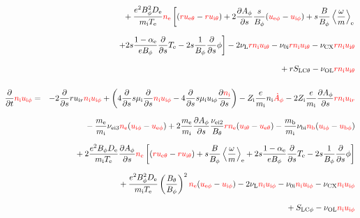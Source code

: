 \documentclass[11pt]{article}
\def\r#1{{\rm#1}}
\def\ddt{\frac{\partial}{\partial t}}
\def\dds{\frac{\partial}{\partial s}}
\def\dd#1{\frac{\partial #1}{\partial s}}
\def\ave#1{\left\langle#1\right\rangle}
\def\me{m_\r{e}}
\def\mi{m_\r{i}}
\def\mb{m_\r{b}}
\def\mui{\mu_\r{i}}
\def\De{D_\r{e}}
\def\Di{D_\r{i}}
\def\nee{n_\r{e}}
\def\ni{n_\r{i}}
\def\nb{n_\r{b}}
\def\uir{u_{\r{i}r}}
\def\ueth{u_{\r{e}\theta}}
\def\uith{u_{\r{i}\theta}}
\def\ueph{u_{\r{e}\phi}}
\def\uiph{u_{\r{i}\phi}}
\def\ubph{u_{\r{b}\phi}}
\def\Bth{B_\theta}
\def\Bph{B_\phi}
\def\Aphd{\dot{A}_\phi}
\def\Aph{A_\phi}
\def\Te{T_\r{e}}
\def\Ti{T_\r{i}}
\def\Zi{Z_\r{i}}
\def\nubi{\nu_\r{bi}}
\def\nuni{\nu_\r{0i}}
\def\nuL{\nu_\r{L}}
\def\nuCX{\nu_\r{CX}}
\def\nuOL{\nu_\r{OL}}
\def\red#1{\textcolor{red}{#1}}
\begin{document}
\begin{eqnarray}
\nonumber\\[2.5mm]&&{}
%
  + \frac{e^2 \Bph^2 \De}{\mi\Te}\red{\nee}
    \left[(\red{r \ueth} - \red{r \uith}) +
     2\dd{\Aph}\frac{s}{\Bph}(\red{\ueph} - \red{\uiph})
     + s \frac{B}{\Bph}\ave{\frac{\omega}{m}}_\r{e}\right.
\nonumber\\[2.5mm]&&{}
%
    \left.+ 2 s \frac{1-\alpha_\r{e}}{e\Bph} \dds \Te
     - 2 s \frac{1}{\Bph} \dds \phi \right]
%
%
  - 2 \nuL \red{r \ni \uith}
%
  - \nuni \red{r \ni \uith}
%
  - \nuCX \red{r \ni \uith}
\nonumber\\[2.5mm]&&{}
%
  + r S_\r{LC\theta}
%
  - \nuOL \red{r \ni \uith}
%
%
\\[5mm]
  \ddt \red{\ni \uiph} &=&
%
  - 2 \dds r \uir \red{\ni \uiph}
%
  + \left(   4 \dds s \mui \dds \red{\ni \uiph}
%
           - 4 \dds s \mui \uiph \dd{\red{\ni}} \right)
%
  - \Zi \frac{e}{\mi} \ni \red{\Aphd}
%
  - 2 \Zi \frac{e}{\mi} \dd{\Aph} \red{r \ni \uir} 
\nonumber\\[2.5mm]&&{}
%
  - \frac{\me}{\mi} \nu_\r{ei3} \red{\nee} (\red{\uiph} - \red{\ueph})
%
  + 2 \frac{\me}{\mi} \dd{\Aph} \frac{\nu_\r{ei2}}{\Bth} \red{r \nee} (\red{\uith} - \red{\ueth})
%
  - \frac{\mb}{\mi} \nubi \red{\nb} (\red{\uiph} - \red{\ubph})
\nonumber\\[2.5mm]&&{}
%
  + 2\frac{e^2 \Bph \De}{\mi\Te}\dd{\Aph}\red{\nee}
    \left[(\red{r \ueth} - \red{r \uith})
     + s \frac{B}{\Bph}\ave{\frac{\omega}{m}}_\r{e}
     + 2 s \frac{1-\alpha_\r{e}}{e\Bph} \dds \Te
     - 2 s \frac{1}{\Bph} \dds \phi \right]
\nonumber\\[2.5mm]&&{}
%
  + \frac{e^2 \Bph^2
  \De}{\mi\Te}\left(\frac{\Bth}{\Bph}\right)^2\red{\nee}(\red{\ueph} - \red{\uiph})
%
%
%
  - 2 \nuL \red{\ni \uiph}
%
  - \nuni \red{\ni \uiph}
%
  - \nuCX \red{\ni \uiph}
\nonumber\\[2.5mm]&&{}
%
  + S_\r{LC\phi}
%
  - \nuOL \red{\ni \uiph}
%

\end{eqnarray}
\end{document}
